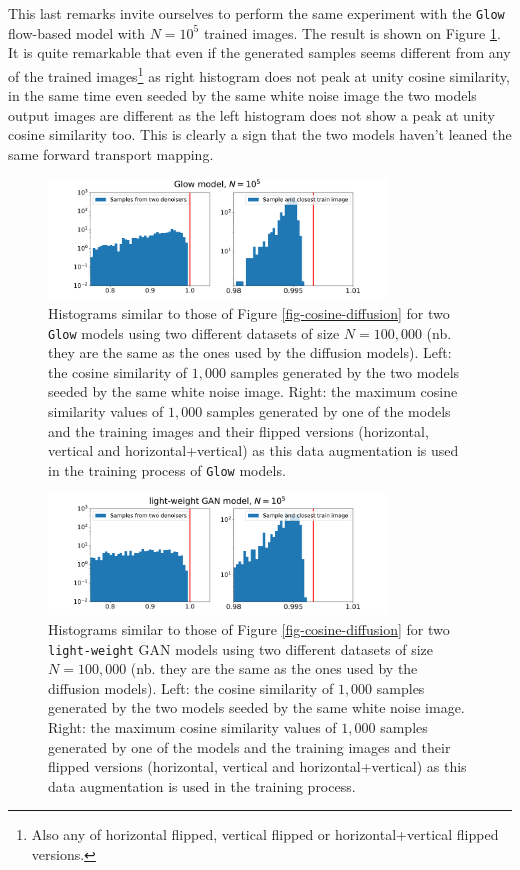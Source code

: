 \documentclass[11pt]{amsart}
\begin{document}
This last remarks invite ourselves to perform the same experiment with the \texttt{Glow} flow-based model with $N=10^5$ trained images. The result is shown on Figure \ref{fig-cosine-glow}. It is quite remarkable that even if the generated samples seems different from any of the trained images\footnote{Also any of horizontal flipped, vertical flipped or horizontal+vertical flipped versions.} as right histogram does not peak at unity cosine similarity, in the same time even seeded by the same white noise image the two models output images are different as the left histogram does not show a peak at unity cosine similarity too. This is clearly a sign that the two models haven't leaned the same forward transport mapping. 
%
\begin{figure}
    \centering
	\includegraphics[width=0.8\textwidth]{fig-glow-cosine-AB_ATrain.pdf}
	\caption{Histograms similar to those of Figure \ref{fig-cosine-diffusion} for two \texttt{Glow} models using two different datasets of size $N=100,000$ (nb. they are the same as the ones used by the diffusion models). Left: the cosine similarity of $1,000$ samples generated by the two models seeded by the same white noise image. Right: the maximum cosine similarity values of $1,000$ samples generated by one of the models and the training images and their flipped versions (horizontal, vertical and horizontal+vertical) as this data augmentation is used in the training process of \texttt{Glow} models.}
	\label{fig-cosine-glow} 
\end{figure}


%
\begin{figure}
    \centering
	\includegraphics[width=0.8\textwidth]{fig-gan-cosine-AB_ATrain.pdf}
	\caption{Histograms similar to those of Figure \ref{fig-cosine-diffusion} for two \texttt{light-weight} GAN models using two different datasets of size $N=100,000$ (nb. they are the same as the ones used by the diffusion models). Left: the cosine similarity of $1,000$ samples generated by the two models seeded by the same white noise image. Right: the maximum cosine similarity values of $1,000$ samples generated by one of the models and the training images and their flipped versions (horizontal, vertical and horizontal+vertical) as this data augmentation is used in the training process.}
	\label{fig-cosine-gan} 
\end{figure}
\end{document}

